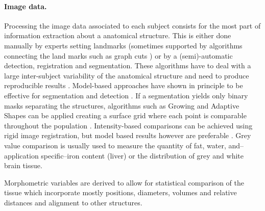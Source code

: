\documentclass[journal]{style/vgtc} 			          %
\begin{document}
\paragraph{Image data. }
Processing the image data associated to each subject consists for the most part of information extraction about a anatomical structure.
%
This is either done manually by experts setting landmarks (sometimes supported by algorithms connecting the land marks such as graph cuts \cite{GraphCut}) or by a (semi)-automatic detection, registration and segmentation.
%
These algorithms have to deal with a large inter-subject variability of the anatomical structure and need to produce reproducible results \cite{Preim2014}.
%
Model-based approaches have shown in principle to be effective for segmentation \cite{Gloger2010, Gloger2012} and detection \cite{Rak2013}.
%
If a segmentation yields only binary masks separating the structures, algorithms such as Growing and Adaptive Shapes can be applied creating a surface grid where each point is comparable throughout the population \cite{Ferrarini2007}.
%
Intensity-based comparisons can be achieved using rigid image registration, but model based results however are preferable \cite{Klemm2012}.
%
Grey value comparison is usually used to measure the quantity of fat, water, and--application specific--iron content (liver) or the distribution of grey and white brain tissue.

Morphometric variables are derived to allow for statistical comparison of the tissue which incorporate mostly positions, diameters, volumes and relative distances and alignment to other structures.
% 
\end{document}
